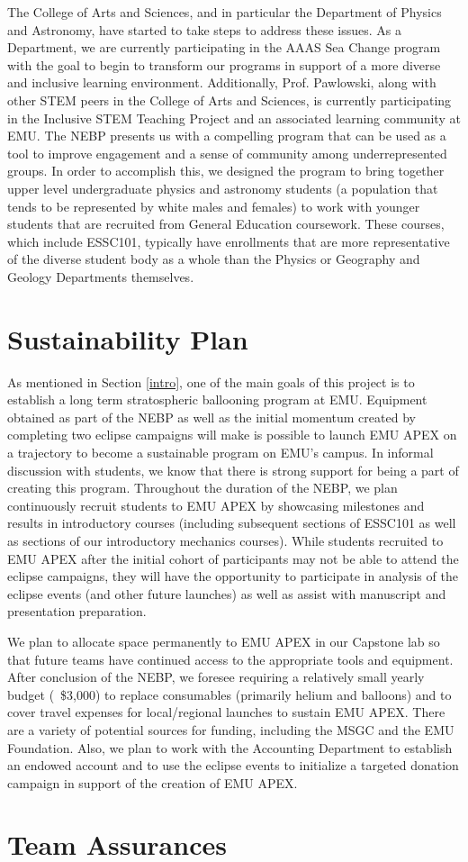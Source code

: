 \documentclass[12pt]{article}
\begin{document}
The College of Arts and Sciences, and in
particular the Department of Physics and Astronomy, have started to take steps to address these issues. As a Department, we are currently
participating in the AAAS Sea Change program with the goal to begin to transform
our programs in support of a more diverse and inclusive learning environment. Additionally,
Prof. Pawlowski, along with other STEM peers in the College of Arts and Sciences, is currently
participating in the Inclusive STEM Teaching Project and an associated learning community
at EMU.
The NEBP presents us with a compelling program that can be used as a tool
to improve engagement and a sense of community among underrepresented
groups. In order to accomplish this, we designed
the program to bring together upper level undergraduate
physics and astronomy students (a population that
tends to be represented by white males and females)
to work with younger students that are recruited from General Education coursework.
These courses, which include ESSC101, typically have enrollments that are more representative
of the diverse student body as a whole than the Physics or Geography and Geology Departments
themselves.




\section{Sustainability Plan}

As mentioned in Section \ref{intro}, one of the main goals of this project
is to establish a long term stratospheric ballooning program at EMU. Equipment
obtained as part of the NEBP as well as the initial momentum created by completing two eclipse campaigns will make is possible to launch
EMU APEX on a trajectory to become a sustainable program on EMU's campus. In informal
discussion with students, we know that there is strong support for
being a part of creating this program. Throughout the duration of the
NEBP, we plan continuously recruit students to EMU APEX by showcasing
milestones and results in introductory courses (including subsequent sections
of ESSC101 as well as sections of our introductory mechanics courses). While
students recruited to EMU APEX after
the initial cohort of participants may not be able to attend the eclipse campaigns,
they will have the opportunity to participate in
analysis of the eclipse events (and other future launches) as well as assist with manuscript and presentation
preparation.

We plan to allocate space permanently to EMU APEX in our Capstone lab
so that future teams have continued access to the appropriate tools and
equipment. After conclusion of the NEBP, we foresee requiring a relatively
small yearly budget (~\$3,000) to replace consumables (primarily helium and balloons)
and to cover travel expenses for local/regional launches
to sustain EMU APEX. There are a variety of potential sources for funding, including
the MSGC and the EMU Foundation. Also, we plan to work with the Accounting Department
to establish an endowed account and to use the
eclipse events to initialize a targeted donation campaign in support of
the creation of EMU APEX.



\section{Team Assurances}
\end{document}
